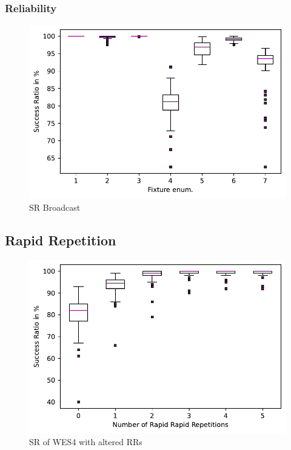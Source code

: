 \subsubsection{Reliability}


\begin{figure}[h]
	\centering
	\includegraphics[scale=0.6]{../Plot2/Graphs/SR_per_fixture_broadcast.pdf}
	\caption{SR Broadcast}
	\label{fig:sr_broadcast}
\end{figure}

\subsection*{Rapid Repetition}

\begin{figure}[h]
	\centering
	\includegraphics[scale=0.6]{../Plot2/Graphs/SR_of_node4_rr.pdf}
	\caption{SR of WES4 with altered RRs}
	\label{fig:sr_broadcast_wes4}
\end{figure}

